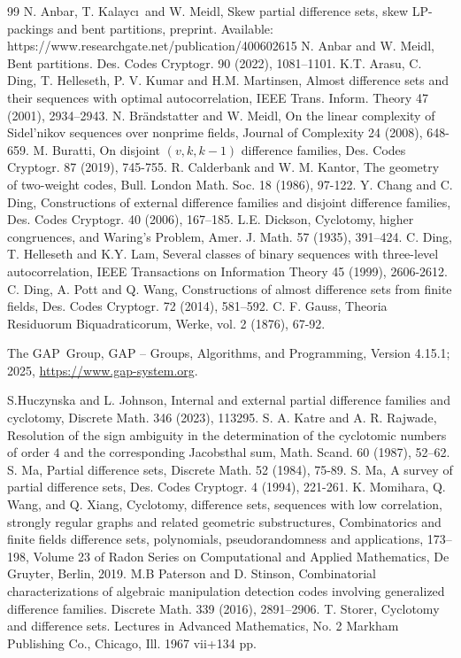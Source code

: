 \documentclass[12pt, a4paper]{article}
\theoremstyle{definition}
\begin{document}
\begin{thebibliography}{99}
 N. Anbar, T. Kalayc\i \ and W. Meidl,  Skew partial difference sets, skew LP-packings and bent partitions, preprint. Available: https://www.researchgate.net/publication/400602615
 N. Anbar and W. Meidl, Bent partitions. Des. Codes Cryptogr. 90 (2022),
1081–1101.
 K.T. Arasu, C. Ding, T. Helleseth, P. V. Kumar and H.M. Martinsen, Almost difference sets and their sequences with optimal autocorrelation,
IEEE Trans. Inform. Theory 47 (2001), 2934–2943.
 N. Br\"andstatter and W. Meidl, On the linear complexity of Sidel’nikov sequences over nonprime fields, Journal of Complexity 24 (2008), 648-659.
 M. Buratti, On disjoint $(v,k,k-1)$ difference families, Des. Codes Cryptogr. 87 (2019), 745-755.
 R. Calderbank and W. M. Kantor, The geometry of two-weight codes, Bull. London Math. Soc. 18 (1986), 97-122.
 Y. Chang and C. Ding, Constructions of external difference families and disjoint difference families, Des. Codes Cryptogr. 40 (2006), 167--185.
 L.E. Dickson, Cyclotomy, higher congruences, and Waring's Problem, Amer. J. Math. 57 (1935), 391--424.
 C. Ding, T. Helleseth and K.Y. Lam, Several classes of binary sequences
with three-level autocorrelation, IEEE Transactions on Information Theory 45 (1999), 2606-2612.
 C. Ding, A. Pott and Q. Wang, Constructions of almost difference sets from finite fields, Des. Codes Cryptogr. 72 (2014), 581--592.
 C. F. Gauss, Theoria Residuorum Biquadraticorum, Werke, vol. 2 (1876), 67-92.

  The GAP~Group, GAP -- Groups, Algorithms, and Programming, 
  Version 4.15.1; 
  2025,
  \url{https://www.gap-system.org}.


 S.Huczynska and L. Johnson, Internal and external partial difference families and cyclotomy, Discrete Math. 346 (2023), 113295.
 S. A. Katre and A. R. Rajwade, Resolution of the sign ambiguity in the determination of the cyclotomic numbers of order $4$ and the corresponding Jacobsthal sum, Math. Scand. 60 (1987), 52--62.
 S. Ma, Partial difference sets, Discrete Math. 52 (1984), 75-89.
 S. Ma, A survey of partial difference sets, Des. Codes Cryptogr. 4 (1994), 221-261.
  K. Momihara, Q. Wang, and Q. Xiang, Cyclotomy, difference sets, sequences with low correlation, strongly regular graphs and related geometric substructures, Combinatorics and finite fields difference sets, polynomials, pseudorandomness and applications, 173–198, Volume
23 of Radon Series on Computational and Applied Mathematics, De
Gruyter, Berlin, 2019.
 M.B Paterson and D. Stinson, Combinatorial characterizations of algebraic manipulation detection codes involving generalized difference families. Discrete Math. 339 (2016), 2891–2906. 
 T. Storer, Cyclotomy and difference sets. Lectures in Advanced Mathematics, No. 2
Markham Publishing Co., Chicago, Ill. 1967 vii+134 pp.
\end{thebibliography}
\end{document}
